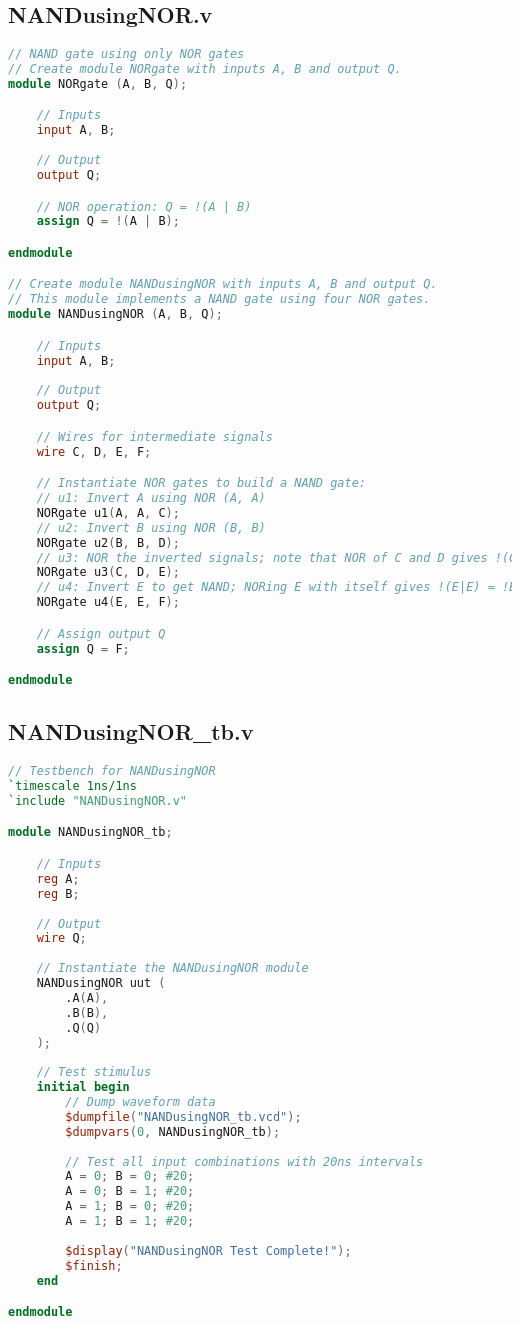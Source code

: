 \documentclass[a4paper,12pt]{article}
\begin{document}
\newpage

\subsection*{NANDusingNOR.v}
\begin{lstlisting}[language=Verilog, caption=NANDusingNOR.v]
// NAND gate using only NOR gates
// Create module NORgate with inputs A, B and output Q.
module NORgate (A, B, Q);

    // Inputs
    input A, B;
    
    // Output
    output Q;

    // NOR operation: Q = !(A | B)
    assign Q = !(A | B);

endmodule

// Create module NANDusingNOR with inputs A, B and output Q.
// This module implements a NAND gate using four NOR gates.
module NANDusingNOR (A, B, Q);

    // Inputs
    input A, B;
    
    // Output
    output Q;

    // Wires for intermediate signals
    wire C, D, E, F;

    // Instantiate NOR gates to build a NAND gate:
    // u1: Invert A using NOR (A, A)
    NORgate u1(A, A, C);
    // u2: Invert B using NOR (B, B)
    NORgate u2(B, B, D);
    // u3: NOR the inverted signals; note that NOR of C and D gives !(C|D) = !( !A or !B) = A and B.
    NORgate u3(C, D, E);
    // u4: Invert E to get NAND; NORing E with itself gives !(E|E) = !E = !(A and B) = A NAND B.
    NORgate u4(E, E, F);

    // Assign output Q
    assign Q = F;

endmodule
\end{lstlisting}

\newpage

\subsection*{NANDusingNOR\_tb.v}
\begin{lstlisting}[language=Verilog, caption=NANDusingNOR_tb.v]
// Testbench for NANDusingNOR
`timescale 1ns/1ns
`include "NANDusingNOR.v"

module NANDusingNOR_tb;

    // Inputs
    reg A;
    reg B;
    
    // Output
    wire Q;
    
    // Instantiate the NANDusingNOR module
    NANDusingNOR uut (
        .A(A),
        .B(B),
        .Q(Q)
    );
    
    // Test stimulus
    initial begin
        // Dump waveform data
        $dumpfile("NANDusingNOR_tb.vcd");
        $dumpvars(0, NANDusingNOR_tb);
        
        // Test all input combinations with 20ns intervals
        A = 0; B = 0; #20;
        A = 0; B = 1; #20;
        A = 1; B = 0; #20;
        A = 1; B = 1; #20;
        
        $display("NANDusingNOR Test Complete!");
        $finish;
    end

endmodule
\end{lstlisting}
\end{document}
